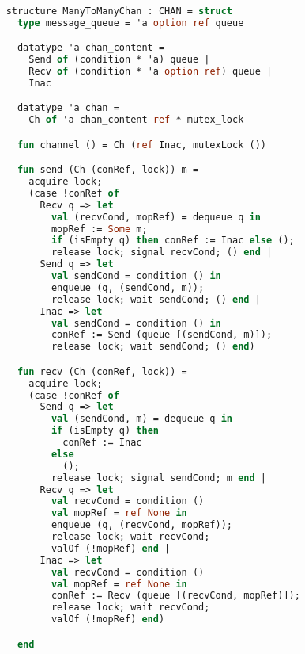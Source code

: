 \documentclass{article}
\begin{document}
  \begin{lstlisting}[language=ML, style=codestyle1]

    structure ManyToManyChan : CHAN = struct
      type message_queue = 'a option ref queue

      datatype 'a chan_content = 
        Send of (condition * 'a) queue | 
        Recv of (condition * 'a option ref) queue | 
        Inac

      datatype 'a chan =
        Ch of 'a chan_content ref * mutex_lock 

      fun channel () = Ch (ref Inac, mutexLock ())

      fun send (Ch (conRef, lock)) m = 
        acquire lock;
        (case !conRef of
          Recv q => let
            val (recvCond, mopRef) = dequeue q in
            mopRef := Some m;
            if (isEmpty q) then conRef := Inac else (); 
            release lock; signal recvCond; () end |
          Send q => let
            val sendCond = condition () in
            enqueue (q, (sendCond, m));
            release lock; wait sendCond; () end |
          Inac => let
            val sendCond = condition () in
            conRef := Send (queue [(sendCond, m)]);
            release lock; wait sendCond; () end)

      fun recv (Ch (conRef, lock)) =  
        acquire lock;
        (case !conRef of 
          Send q => let
            val (sendCond, m) = dequeue q in
            if (isEmpty q) then
              conRef := Inac
            else
              (); 
            release lock; signal sendCond; m end |
          Recv q => let
            val recvCond = condition ()
            val mopRef = ref None in
            enqueue (q, (recvCond, mopRef));
            release lock; wait recvCond;
            valOf (!mopRef) end |
          Inac => let
            val recvCond = condition ()
            val mopRef = ref None in
            conRef := Recv (queue [(recvCond, mopRef)]);
            release lock; wait recvCond;
            valOf (!mopRef) end)

      end

    \end{lstlisting}
\end{document}
